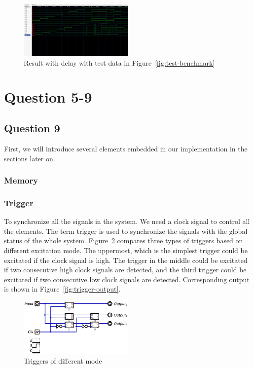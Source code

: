 \documentclass[conference]{IEEEtran}
\begin{document}
\begin{figure}[h!]
    \centering
    \includegraphics[width=0.5\textwidth]{assets/gtkwave.png}
    \caption{Result with delay with test data in Figure~\ref{fig:test-benchmark}}
    \label{fig:result-with-delay}
\end{figure}

\section{Question 5-9}

\subsection{Question 9}

First, we will introduce several elements embedded in our implementation in the sections later on.

\subsubsection{Memory}

\subsubsection{Trigger}

To synchronize all the signals in the system. We need a clock signal to control all the elements. The term trigger is used to synchronize the signals
with the global status of the whole system. Figure~\ref{fig:triggers} compares three types of triggers based on different excitation mode. The uppermost, which is the simplest trigger could be excitated if
the clock signal is high. The trigger in the middle could be excitated if two consecutive high clock signals are detected, and the third trigger could be excitated if two consecutive low clock signals are detected. Corresponding output is shown in Figure~\ref{fig:trigger-output}.

\begin{figure}[h!]
    \centering
    \includegraphics[width=0.5\textwidth]{assets/triggers.png}
    \caption{Triggers of different mode}
    \label{fig:triggers}
\end{figure}
\end{document}
